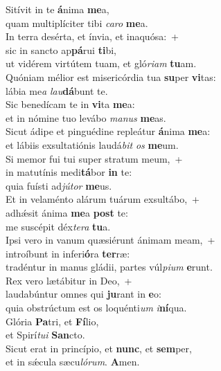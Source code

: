 \evenverse Sitívit in te \textbf{á}nima \textbf{me}a,~\*\\
\evenverse quam multiplíciter tibi \textit{ca}\textit{ro} \textbf{me}a.\\
\oddverse In terra desérta, et ínvia, et inaquósa:~+\\
\oddverse  sic in sancto ap\textbf{pá}rui \textbf{ti}bi,~\*\\
\oddverse ut vidérem virtútem tuam, et gló\textit{ri}\textit{am} \textbf{tu}am.\\
\evenverse Quóniam mélior est misericórdia tua \textbf{su}per \textbf{vi}tas:~\*\\
\evenverse lábia me\textit{a} \textit{lau}\textbf{dá}bunt te.\\
\oddverse Sic benedícam te in \textbf{vi}ta \textbf{me}a:~\*\\
\oddverse et in nómine tuo levábo \textit{ma}\textit{nus} \textbf{me}as.\\
\evenverse Sicut ádipe et pinguédine repleátur \textbf{á}nima \textbf{me}a:~\*\\
\evenverse et lábiis exsultatiónis laudá\textit{bit} \textit{os} \textbf{me}um.\\
\oddverse Si memor fui tui super stratum meum,~+\\
\oddverse  in matutínis medi\textbf{tá}bor \textbf{in} te:~\*\\
\oddverse quia fuísti ad\textit{jú}\textit{tor} \textbf{me}us.\\
\evenverse Et in velaménto alárum tuárum exsultábo,~+\\
\evenverse  adhǽsit ánima \textbf{me}a \textbf{post} te:~\*\\
\evenverse me suscépit déx\textit{te}\textit{ra} \textbf{tu}a.\\
\oddverse Ipsi vero in vanum quæsiérunt ánimam meam,~+\\
\oddverse  introíbunt in inferi\textbf{ó}ra \textbf{ter}ræ:~\*\\
\oddverse tradéntur in manus gládii, partes vúl\textit{pi}\textit{um} \textbf{e}runt.\\
\evenverse Rex vero lætábitur in Deo,~+\\
\evenverse  laudabúntur omnes qui \textbf{ju}rant in \textbf{e}o:~\*\\
\evenverse quia obstrúctum est os loquénti\textit{um} \textit{i}\textbf{ní}qua.\\
\oddverse Glória \textbf{Pa}tri, et \textbf{Fí}lio,~\*\\
\oddverse et Spirí\textit{tu}\textit{i} \textbf{San}cto.\\
\evenverse Sicut erat in princípio, et \textbf{nunc}, et \textbf{sem}per,~\*\\
\evenverse et in sǽcula sæcu\textit{ló}\textit{rum}. \textbf{A}men.\\
